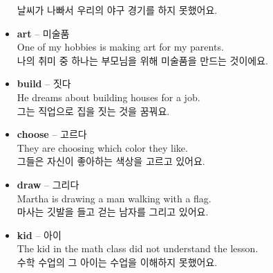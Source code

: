 \documentclass[12pt]{article}
\begin{document}
\begin{itemize}
    날씨가 나빠서 우리의 야구 경기를 하지 못했어요.
    \item \textbf{art} -- 미술품 \\
    One of my hobbies is making art for my parents. \\
    나의 취미 중 하나는 부모님을 위해 미술품을 만드는 것이에요.
    \item \textbf{build} -- 짓다 \\
    He dreams about building houses for a job. \\
    그는 직업으로 집을 짓는 것을 꿈꿔요.
    \item \textbf{choose} -- 고르다 \\
    They are choosing which color they like. \\
    그들은 자신이 좋아하는 색상을 고르고 있어요.
    \item \textbf{draw} -- 그리다 \\
    Martha is drawing a man walking with a flag. \\
    마사는 깃발을 들고 걷는 남자를 그리고 있어요.
    \item \textbf{kid} -- 아이 \\
    The kid in the math class did not understand the lesson. \\
    수학 수업의 그 아이는 수업을 이해하지 못했어요.
\end{itemize}

\newpage
\end{document}
